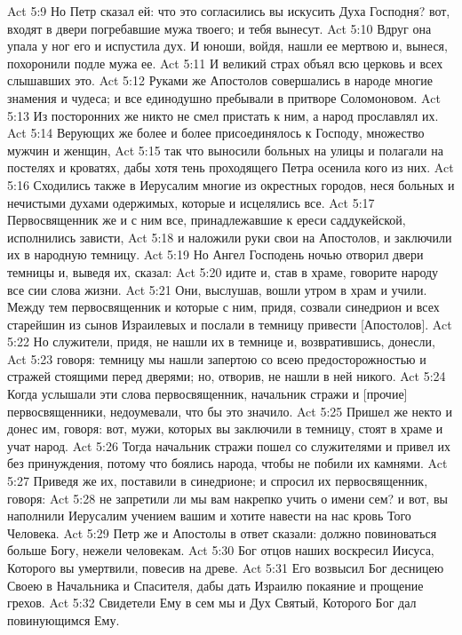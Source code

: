 Act 5:9  Но Петр сказал ей: что это согласились вы искусить Духа Господня? вот, входят в двери погребавшие мужа твоего; и тебя вынесут.
Act 5:10  Вдруг она упала у ног его и испустила дух. И юноши, войдя, нашли ее мертвою и, вынеся, похоронили подле мужа ее.
Act 5:11  И великий страх объял всю церковь и всех слышавших это.
Act 5:12  Руками же Апостолов совершались в народе многие знамения и чудеса; и все единодушно пребывали в притворе Соломоновом.
Act 5:13  Из посторонних же никто не смел пристать к ним, а народ прославлял их.
Act 5:14  Верующих же более и более присоединялось к Господу, множество мужчин и женщин,
Act 5:15  так что выносили больных на улицы и полагали на постелях и кроватях, дабы хотя тень проходящего Петра осенила кого из них.
Act 5:16  Сходились также в Иерусалим многие из окрестных городов, неся больных и нечистыми духами одержимых, которые и исцелялись все.
Act 5:17  Первосвященник же и с ним все, принадлежавшие к ереси саддукейской, исполнились зависти,
Act 5:18  и наложили руки свои на Апостолов, и заключили их в народную темницу.
Act 5:19  Но Ангел Господень ночью отворил двери темницы и, выведя их, сказал:
Act 5:20  идите и, став в храме, говорите народу все сии слова жизни.
Act 5:21  Они, выслушав, вошли утром в храм и учили. Между тем первосвященник и которые с ним, придя, созвали синедрион и всех старейшин из сынов Израилевых и послали в темницу привести [Апостолов].
Act 5:22  Но служители, придя, не нашли их в темнице и, возвратившись, донесли,
Act 5:23  говоря: темницу мы нашли запертою со всею предосторожностью и стражей стоящими перед дверями; но, отворив, не нашли в ней никого.
Act 5:24  Когда услышали эти слова первосвященник, начальник стражи и [прочие] первосвященники, недоумевали, что бы это значило.
Act 5:25  Пришел же некто и донес им, говоря: вот, мужи, которых вы заключили в темницу, стоят в храме и учат народ.
Act 5:26  Тогда начальник стражи пошел со служителями и привел их без принуждения, потому что боялись народа, чтобы не побили их камнями.
Act 5:27  Приведя же их, поставили в синедрионе; и спросил их первосвященник, говоря:
Act 5:28  не запретили ли мы вам накрепко учить о имени сем? и вот, вы наполнили Иерусалим учением вашим и хотите навести на нас кровь Того Человека.
Act 5:29  Петр же и Апостолы в ответ сказали: должно повиноваться больше Богу, нежели человекам.
Act 5:30  Бог отцов наших воскресил Иисуса, Которого вы умертвили, повесив на древе.
Act 5:31  Его возвысил Бог десницею Своею в Начальника и Спасителя, дабы дать Израилю покаяние и прощение грехов.
Act 5:32  Свидетели Ему в сем мы и Дух Святый, Которого Бог дал повинующимся Ему.
